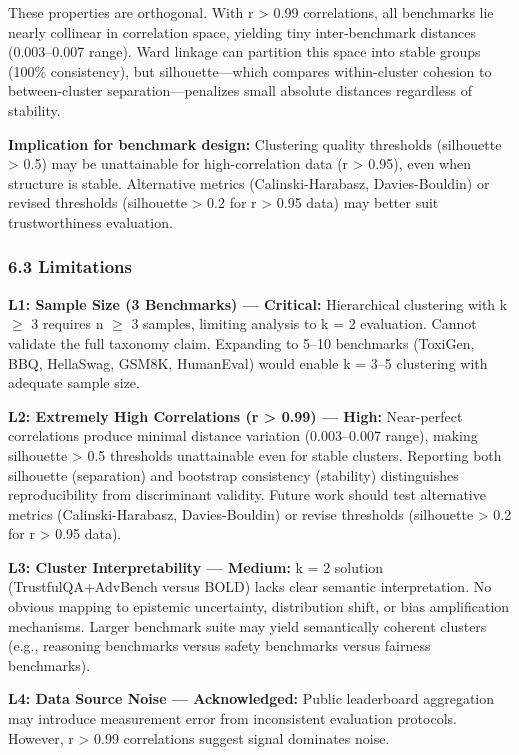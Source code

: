 These properties are orthogonal. With r > 0.99 correlations, all benchmarks lie nearly collinear in correlation space, yielding tiny inter-benchmark distances (0.003--0.007 range). Ward linkage can partition this space into stable groups (100\% consistency), but silhouette---which compares within-cluster cohesion to between-cluster separation---penalizes small absolute distances regardless of stability.

\textbf{Implication for benchmark design:} Clustering quality thresholds (silhouette > 0.5) may be unattainable for high-correlation data (r > 0.95), even when structure is stable. Alternative metrics (Calinski-Harabasz, Davies-Bouldin) or revised thresholds (silhouette > 0.2 for r > 0.95 data) may better suit trustworthiness evaluation.

\subsubsection{6.3 Limitations}

\textbf{L1: Sample Size (3 Benchmarks) --- Critical:} Hierarchical clustering with k $\geq$ 3 requires n $\geq$ 3 samples, limiting analysis to k = 2 evaluation. Cannot validate the full taxonomy claim. Expanding to 5--10 benchmarks (ToxiGen, BBQ, HellaSwag, GSM8K, HumanEval) would enable k = 3--5 clustering with adequate sample size.

\textbf{L2: Extremely High Correlations (r > 0.99) --- High:} Near-perfect correlations produce minimal distance variation (0.003--0.007 range), making silhouette > 0.5 thresholds unattainable even for stable clusters. Reporting both silhouette (separation) and bootstrap consistency (stability) distinguishes reproducibility from discriminant validity. Future work should test alternative metrics (Calinski-Harabasz, Davies-Bouldin) or revise thresholds (silhouette > 0.2 for r > 0.95 data).

\textbf{L3: Cluster Interpretability --- Medium:} k = 2 solution (TrustfulQA+AdvBench versus BOLD) lacks clear semantic interpretation. No obvious mapping to epistemic uncertainty, distribution shift, or bias amplification mechanisms. Larger benchmark suite may yield semantically coherent clusters (e.g., reasoning benchmarks versus safety benchmarks versus fairness benchmarks).

\textbf{L4: Data Source Noise --- Acknowledged:} Public leaderboard aggregation may introduce measurement error from inconsistent evaluation protocols. However, r > 0.99 correlations suggest signal dominates noise.

